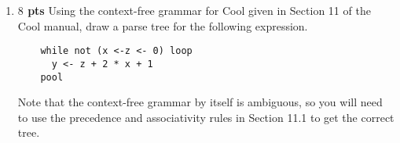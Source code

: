 \documentclass[10pt]{article}
\newcommand {\pts}[1]{{\bf #1 pts}}
\begin{document}
\begin{enumerate}
\begin{enumerate}
\begin{center}
\[    \begin{table}[h!]
      \begin{tabular}{|c|c|c|c|c|}
      \hline
      Non-terminal           &                        &                        & INPUT SYMBOL             &                                                                   \\ \hline
      \multicolumn{1}{|l|}{} & \multicolumn{1}{l|}{(} & \multicolumn{1}{l|}{)} & \multicolumn{1}{l|}{{]}} & \multicolumn{1}{l|}{\$}                                           \\ \hline
      S                      & S $\to$ X              &   S $\to$ E]        S $\to$ F)               &          S $\to$ E]        S $\to$ F)                   & \begin{tabular}[c]{@{}c@{}}S $\to$ E{]}\\ S $\to$ F)\end{tabular} \\ \hline
      X                      &                &                 X   $\to$  E)         &      X $\to$ F]                      & X $\to$ E)X $\to$ F{]}                                            \\ \hline
      E                      &                        & E $\to$ A              & E $\to$ A                &                                                                   \\ \hline
      F                      &                        & F $\to$ A              & F $\to$ A                &                                                                   \\ \hline
      A                      &                        & A $\to$ $\epsilon$     & A $\to$ $\epsilon$       &                                                                   \\ \hline
      \end{tabular}
      \end{table}
    $$
    \]
  \end{center}
  \item Is this grammar LALR(1)? and Why.
    \[
    $$
    No. There are conflicts in $E \to A$ and $F \to A$.
    $$  
    \]
\end{enumerate}

\item \pts{$8$}  Using the context-free grammar for Cool given in Section 11 of the Cool
manual, draw a parse tree for the following expression.
  \begin{lstlisting}
    while not (x <-z <- 0) loop
      y <- z + 2 * x + 1
    pool
  \end{lstlisting}
Note that the context-free grammar by itself is ambiguous, so you will
need to use the precedence and associativity rules in Section 11.1 to
get the correct tree.
         

\end{enumerate}
\end{document}
